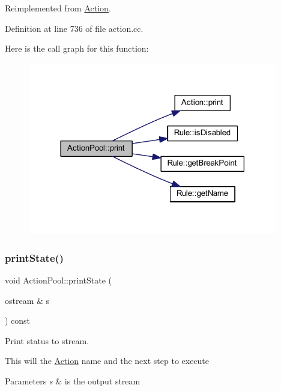 Reimplemented from \mbox{\hyperlink{class_action_a0f7c833f74d267d7fbc50fa9e0f2a964}{Action}}.



Definition at line 736 of file action.\+cc.

Here is the call graph for this function\+:
\nopagebreak
\begin{figure}[H]
\begin{center}
\leavevmode
\includegraphics[width=309pt]{class_action_pool_a543411d736e1a5766a74fe30b65efdd8_cgraph}
\end{center}
\end{figure}
\mbox{\label{class_action_pool_ac3301606be4afd36584109196c71e2ed}} 
\subsubsection{\texorpdfstring{printState()}{printState()}}
{\footnotesize\ttfamily void Action\+Pool\+::print\+State (\begin{DoxyParamCaption}\item[{ostream \&}]{s }\end{DoxyParamCaption}) const\hspace{0.3cm}{\ttfamily [virtual]}}



Print status to stream. 

This will the \mbox{\hyperlink{class_action}{Action}} name and the next step to execute 
\begin{DoxyParams}{Parameters}
{\em s} & is the output stream \\
\hline
\end{DoxyParams}


